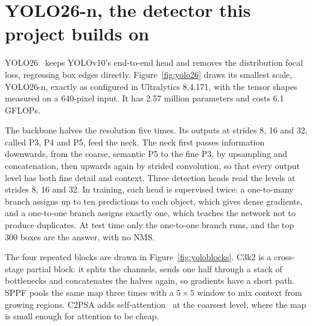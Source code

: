 
\section{YOLO26-n, the detector this project builds on}

YOLO26~\cite{yolo26_2026} keeps YOLOv10's end-to-end head and removes the distribution focal loss, regressing box
edges directly. Figure~\ref{fig:yolo26} draws its smallest scale, YOLO26-n, exactly as configured in Ultralytics
8.4.171, with the tensor shapes measured on a 640-pixel input. It has 2.57 million parameters and costs 6.1
GFLOPs.

The backbone halves the resolution five times. Its outputs at strides 8, 16 and 32, called P3, P4 and P5, feed the
neck. The neck first passes information downwards, from the coarse, semantic P5 to the fine P3, by upsampling and
concatenation, then upwards again by strided convolution, so that every output level has both fine detail and
context. Three detection heads read the levels at strides 8, 16 and 32. In training, each head is supervised twice:
a one-to-many branch assigns up to ten predictions to each object, which gives dense gradients, and a one-to-one
branch assigns exactly one, which teaches the network not to produce duplicates. At test time only the one-to-one
branch runs, and the top 300 boxes are the answer, with no NMS.


The four repeated blocks are drawn in Figure~\ref{fig:yoloblocks}. C3k2 is a cross-stage partial block: it splits
the channels, sends one half through a stack of bottlenecks and concatenates the halves again, so gradients have a
short path. SPPF pools the same map three times with a $5\times5$ window to mix context from growing regions.
C2PSA adds self-attention~\cite{vaswani2017attention} at the coarsest level, where the map is small enough for
attention to be cheap.

